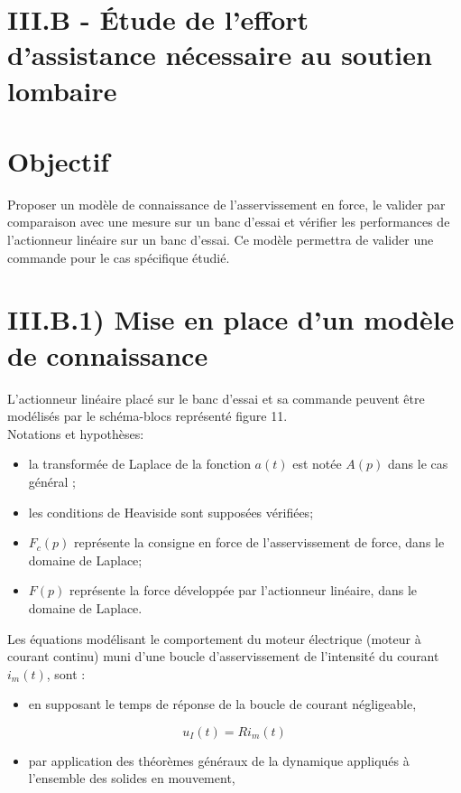 \section{III.B - Étude de l'effort d'assistance nécessaire au soutien lombaire}
\section{Objectif}
Proposer un modèle de connaissance de l'asservissement en force, le valider par comparaison avec une mesure sur un banc d'essai et vérifier les performances de l'actionneur linéaire sur un banc d'essai. Ce modèle permettra de valider une commande pour le cas spécifique étudié.

\section{III.B.1) Mise en place d'un modèle de connaissance}
L'actionneur linéaire placé sur le banc d'essai et sa commande peuvent être modélisés par le schéma-blocs représenté figure 11.\\
Notations et hypothèses:

\begin{itemize}
  \item la transformée de Laplace de la fonction $a(t)$ est notée $A(p)$ dans le cas général ;
  \item les conditions de Heaviside sont supposées vérifiées;
  \item $F_{c}(p)$ représente la consigne en force de l'asservissement de force, dans le domaine de Laplace;
  \item $F(p)$ représente la force développée par l'actionneur linéaire, dans le domaine de Laplace.
\end{itemize}

Les équations modélisant le comportement du moteur électrique (moteur à courant continu) muni d'une boucle d'asservissement de l'intensité du courant $i_{m}(t)$, sont :

\begin{itemize}
  \item en supposant le temps de réponse de la boucle de courant négligeable,
\end{itemize}

$$
u_{I}(t)=R i_{m}(t)
$$

\begin{itemize}
  \item par application des théorèmes généraux de la dynamique appliqués à l'ensemble des solides en mouvement,
\end{itemize}

